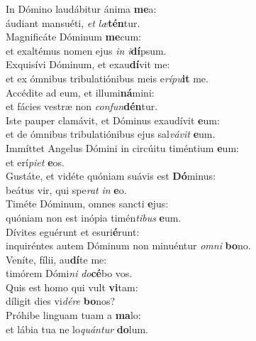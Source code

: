 \evenverse In Dómino laudábitur ánima \textbf{me}a:~\*\\
\evenverse áudiant mansuéti, \textit{et} \textit{læ}\textbf{tén}tur.\\
\oddverse Magnificáte Dóminum \textbf{me}cum:~\*\\
\oddverse et exaltémus nomen ejus \textit{in} \textit{i}\textbf{dí}psum.\\
\evenverse Exquisívi Dóminum, et exau\textbf{dí}vit me:~\*\\
\evenverse et ex ómnibus tribulatiónibus meis e\textit{rí}\textit{pu}\textbf{it} me.\\
\oddverse Accédite ad eum, et illumi\textbf{ná}mini:~\*\\
\oddverse et fácies vestræ non \textit{con}\textit{fun}\textbf{dén}tur.\\
\evenverse Iste pauper clamávit, et Dóminus exaudívit \textbf{e}um:~\*\\
\evenverse et de ómnibus tribulatiónibus ejus sal\textit{vá}\textit{vit} \textbf{e}um.\\
\oddverse Immíttet Angelus Dómini in circúitu timéntium \textbf{e}um:~\*\\
\oddverse et erí\textit{pi}\textit{et} \textbf{e}os.\\
\evenverse Gustáte, et vidéte quóniam suávis est \textbf{Dó}minus:~\*\\
\evenverse beátus vir, qui spe\textit{rat} \textit{in} \textbf{e}o.\\
\oddverse Timéte Dóminum, omnes sancti \textbf{e}jus:~\*\\
\oddverse quóniam non est inópia timén\textit{ti}\textit{bus} \textbf{e}um.\\
\evenverse Dívites eguérunt et esuri\textbf{é}runt:~\*\\
\evenverse inquiréntes autem Dóminum non minuéntur \textit{om}\textit{ni} \textbf{bo}no.\\
\oddverse Veníte, fílii, au\textbf{dí}te me:~\*\\
\oddverse timórem Dómi\textit{ni} \textit{do}\textbf{cé}bo vos.\\
\evenverse Quis est homo qui vult \textbf{vi}tam:~\*\\
\evenverse díligit dies vi\textit{dé}\textit{re} \textbf{bo}nos?\\
\oddverse Próhibe linguam tuam a \textbf{ma}lo:~\*\\
\oddverse et lábia tua ne lo\textit{quán}\textit{tur} \textbf{do}lum.\\
